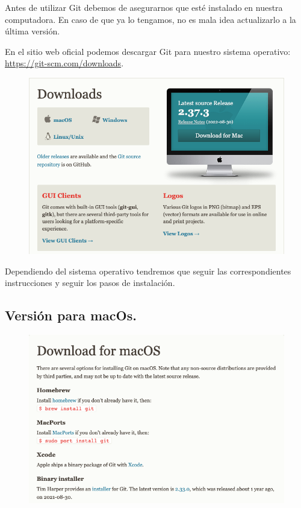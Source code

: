 Antes de utilizar Git debemos de asegurarnos que esté instalado en nuestra computadora. En caso de que ya lo tengamos, no es mala idea actualizarlo a la última versión.
\par
En el sitio web oficial podemos descargar Git para nuestro sistema operativo: \href{https://git-scm.com/downloads}{https://git-scm.com/downloads}.
\begin{figure}[H]
    \centering
    \includegraphics[scale=0.5]{Imagenes/git_01.png}
\end{figure}

Dependiendo del sistema operativo tendremos que seguir las correspondientes instrucciones y seguir los pasos de instalación.

\subsection*{Versión para macOs.}

\begin{figure}[H]
    \centering
    \includegraphics[scale=0.4]{Imagenes/git_02.png}
\end{figure}

